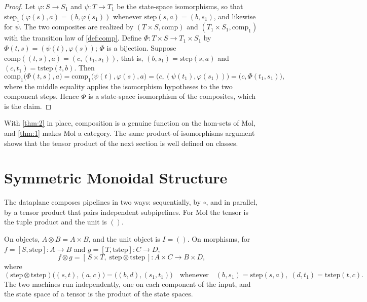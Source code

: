 \begin{proof}
Let $\varphi : S \to S_1$ and $\psi : T \to T_1$ be the state-space
isomorphisms, so that
$\mathrm{step}_1 (\varphi (s), a) = (b, \varphi (s_1))$ whenever
$\mathrm{step} (s, a) = (b, s_1)$, and likewise for $\psi$. The two composites
are realized by $(T \times S, \mathrm{comp})$ and
$(T_1 \times S_1, \mathrm{comp}_1)$ with the transition law of
\autoref{def:comp}. Define $\Phi : T \times S \to T_1 \times S_1$ by
$\Phi (t, s) = (\psi (t), \varphi (s))$; $\Phi$ is a bijection. Suppose
$\mathrm{comp} ((t, s), a) = (c, (t_1, s_1))$, that is,
$(b, s_1) = \mathrm{step} (s, a)$ and $(c, t_1) = \mathrm{tstep} (t, b)$. Then
\[ \mathrm{comp}_1\bigl (\Phi (t, s), a\bigr)
   = \mathrm{comp}_1\bigl (\psi (t), \varphi (s), a\bigr)
   = \bigl (c, (\psi (t_1), \varphi (s_1))\bigr)
   = \bigl (c, \Phi (t_1, s_1)\bigr) , \]
where the middle equality applies the isomorphism hypotheses to the two
component steps. Hence $\Phi$ is a state-space isomorphism of the composites,
which is the claim.
\end{proof}

\begin{remark}
With \autoref{thm:2} in place, composition is a genuine function on the
hom-sets of Mol, and \autoref{thm:1} makes Mol a category. The same
product-of-isomorphisms argument shows that the tensor product of the next
section is well defined on classes.
\end{remark}

\section{Symmetric Monoidal Structure}\label{sec:mol-mon}

The dataplane composes pipelines in two ways: sequentially, by $\circ$, and in
parallel, by a tensor product that pairs independent subpipelines. For Mol the
tensor is the tuple product and the unit is $()$.

\begin{definition}\label{def:tensor}
On objects, $A \otimes B = A \times B$, and the unit object is
$I = ()$. On morphisms, for $f = [S, \mathrm{step}] : A \to B$ and
$g = [T, \mathrm{tstep}] : C \to D$,
\[ f \otimes g = [\, S \times T,\; \mathrm{step} \otimes \mathrm{tstep} \,]
   : A \times C \to B \times D , \]
where
\[ (\mathrm{step} \otimes \mathrm{tstep})\bigl ((s, t), (a, c)\bigr)
   = \bigl ((b, d), (s_1, t_1)\bigr)
   \quad\text{whenever}\quad (b, s_1) = \mathrm{step} (s, a),\; (d, t_1)
   = \mathrm{tstep} (t, c) . \]
The two machines run independently, one on each component of the input, and
the state space of a tensor is the product of the state spaces.
\end{definition}

